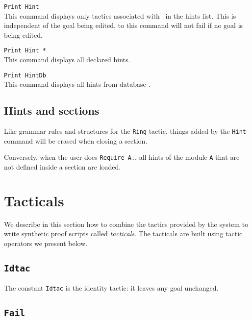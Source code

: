 \begin{Variants}
\item {\tt  Print Hint {\ident} }\\
 This command displays only tactics associated with \ident\ in the
 hints list. This is independent of the goal being edited, to this
 command will not fail if no goal is being edited.

\item {\tt Print Hint *}\\
  This command displays all declared hints. 

\item {\tt  Print HintDb {\ident} }\\
\label{PrintHintDb}
 This command displays all hints from database \ident.
\end{Variants}


\subsection{Hints and sections}
\label{Hint-and-Section}

Like grammar rules and structures for the \texttt{Ring} tactic, things 
added by the \texttt{Hint} command will be erased when closing a
section.

Conversely, when the user does \texttt{Require A.}, all hints 
of the module \texttt{A} that are not defined inside a section are
loaded.

\section{Tacticals}
\label{Tacticals}
We describe in this section how to combine the tactics provided by the
system to write synthetic proof scripts called {\em tacticals}. The
tacticals are built using tactic operators we present below.

\subsection{\tt Idtac}
 The constant {\tt Idtac} is the
identity tactic: it leaves any goal unchanged.

\subsection{\tt Fail}

